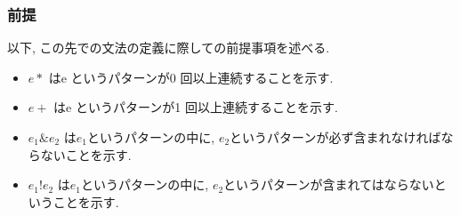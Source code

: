 \documentclass{jlreq}
\begin{document}
            \subsubsection{前提}
                以下, この先での文法の定義に際しての前提事項を述べる.
                \begin{itemize}
                    \item $e*$ はe というパターンが0 回以上連続することを示す.
                    \item $e+$ はe というパターンが1 回以上連続することを示す.
                    \item $e_1 \&e_2$ は$e_1$というパターンの中に, $e_2$というパターンが必ず含まれなければならないことを示す.
                    \item $e_1 !e_2$ は$e_1$というパターンの中に, $e_2$というパターンが含まれてはならないということを示す.
                \end{itemize}
\end{document}
